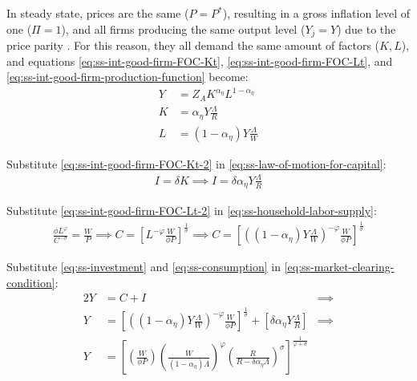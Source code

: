 \documentclass[
	12pt,
	]{article}
\numberwithin{equation}{section}
\theoremstyle{definition}
\theoremstyle{plain}
\theoremstyle{plain}
\theoremstyle{plain}
\begin{document}
In steady state, prices are the same ($P=P^\ast$), resulting in a gross inflation level of one ($\Pi=1$), and all firms producing the same output level ($Y_j=Y$) due to the price parity \cite[Lecture 13, p.12]{solis-garcia_ucb_2022}. For this reason, they all demand the same amount of factors ($K,L$), and equations \ref{eq:ss-int-good-firm-FOC-Kt}, \ref{eq:ss-int-good-firm-FOC-Lt}, and \ref{eq:ss-int-good-firm-production-function} become:
\begin{align}
	\label{eq:ss-int-good-firm-production-function-2}
	Y &= Z_{A} K^{\alpha_\eta} L^{1-{\alpha_\eta}}   \\
	\label{eq:ss-int-good-firm-FOC-Kt-2}
	K &= {\alpha_\eta} Y \frac{\Lambda}{R}    \\
	\label{eq:ss-int-good-firm-FOC-Lt-2}
	L &= (1-{\alpha_\eta}) Y \frac{\Lambda}{W}
\end{align}

Substitute \ref{eq:ss-int-good-firm-FOC-Kt-2} in \ref{eq:ss-law-of-motion-for-capital}:
\begin{align}
	\label{eq:ss-investment}
	I = \delta K \implies I = \delta {\alpha_\eta} Y \frac{\Lambda}{R}
\end{align}

Substitute \ref{eq:ss-int-good-firm-FOC-Lt-2} in \ref{eq:ss-household-labor-supply}:
\begin{align}
	\label{eq:ss-consumption}
	\frac{\phi L^{\varphi}}{C^{-\sigma}} = \frac{W}{P}
	\implies
	C = \left[ L^{-\varphi} \frac{W}{\phi P} \right]^{\frac{1}{\sigma}}
	\implies
	C = \left[ \left( (1-{\alpha_\eta}) Y \frac{\Lambda}{W} \right)^{-\varphi} \frac{W}{\phi P} \right]^{\frac{1}{\sigma}}
\end{align}

Substitute \ref{eq:ss-investment} and \ref{eq:ss-consumption} in \ref{eq:ss-market-clearing-condition}:
\begin{alignat}{2}
	Y &= C + I &\implies \nonumber \\
	Y &= \left[ \left( (1-{\alpha_\eta}) Y \frac{\Lambda}{W} \right)^{-\varphi} \frac{W}{\phi P} \right]^{\frac{1}{\sigma}} + \left[ \delta {\alpha_\eta} Y \frac{\Lambda}{R} \right] &\implies \nonumber \\
	Y &=\left[
	\left( \frac{W}{\phi P}                \right)
	\left( \frac{W}{(1-{\alpha_\eta})\Lambda}     \right)^\varphi
	\left( \frac{R}{R-\delta{\alpha_\eta}\Lambda} \right)^\sigma
	\right]^\frac{1}{\varphi+\sigma} & \label{eq:ss-production}
\end{alignat}
\end{document}
